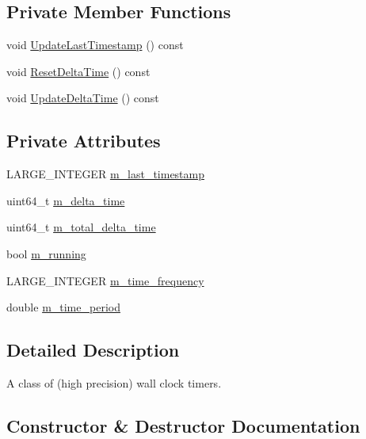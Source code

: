 \subsection*{Private Member Functions}
\begin{DoxyCompactItemize}
\item 
void \hyperlink{classmage_1_1_timer_af1306c089d5e71fa5b3093d71ab55c45}{Update\+Last\+Timestamp} () const
\item 
void \hyperlink{classmage_1_1_timer_af9f185515128afd02ff36ac36f665552}{Reset\+Delta\+Time} () const
\item 
void \hyperlink{classmage_1_1_timer_abb7112fc15fa0847c90437dc8fee5615}{Update\+Delta\+Time} () const
\end{DoxyCompactItemize}
\subsection*{Private Attributes}
\begin{DoxyCompactItemize}
\item 
L\+A\+R\+G\+E\+\_\+\+I\+N\+T\+E\+G\+ER \hyperlink{classmage_1_1_timer_a6effbc37827492397cc781a78165a08a}{m\+\_\+last\+\_\+timestamp}
\item 
uint64\+\_\+t \hyperlink{classmage_1_1_timer_abc87d3df1af91f1c8cfb1ad7728e8b55}{m\+\_\+delta\+\_\+time}
\item 
uint64\+\_\+t \hyperlink{classmage_1_1_timer_a7831a92c4f3b4a3190d26250fd069b75}{m\+\_\+total\+\_\+delta\+\_\+time}
\item 
bool \hyperlink{classmage_1_1_timer_ac8d975843e5b2199848284de910d3291}{m\+\_\+running}
\item 
L\+A\+R\+G\+E\+\_\+\+I\+N\+T\+E\+G\+ER \hyperlink{classmage_1_1_timer_a64e9afd31a95058e1736e84122c663d3}{m\+\_\+time\+\_\+frequency}
\item 
double \hyperlink{classmage_1_1_timer_a577257c9664421250f5b060eb7cf63fa}{m\+\_\+time\+\_\+period}
\end{DoxyCompactItemize}


\subsection{Detailed Description}
A class of (high precision) wall clock timers. 

\subsection{Constructor \& Destructor Documentation}
\hypertarget{classmage_1_1_timer_a5e1c0a3bb4491b3a43ce05874ad24055}{}\label{classmage_1_1_timer_a5e1c0a3bb4491b3a43ce05874ad24055} 
